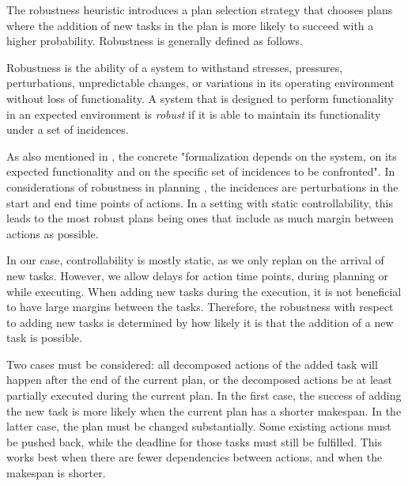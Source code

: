 The robustness heuristic introduces a plan selection strategy that chooses plans where the addition of new tasks in the plan is more likely to succeed with a higher probability.
Robustness is generally defined as follows.

\begin{definition}[Robustness]
    Robustness is the ability of a system to withstand stresses, pressures, perturbations, unpredictable changes, or variations in its operating environment without loss of functionality.
    A system that is designed to perform functionality in an expected environment is \emph{robust} if it is able to maintain its functionality under a set of incidences. \citep{barberRobustnessStabilityRecoverability2015}
\end{definition}

As also mentioned in \cite{barberRobustnessStabilityRecoverability2015}, the concrete "formalization depends on the system, on its expected functionality and on the specific set of incidences to be confronted".
In considerations of robustness in planning \citep{lundRobustExecutionProbabilistic2017}, the incidences are perturbations in the start and end time points of actions.
In a setting with static controllability, this leads to the most robust plans being ones that include as much margin between actions as possible.

In our case, controllability is mostly static, as we only replan on the arrival of new tasks.
However, we allow delays for action time points, during planning or while executing.
When adding new tasks during the execution, it is not beneficial to have large margins between the tasks.
Therefore, the robustness with respect to adding new tasks is determined by how likely it is that the addition of a new task is possible.

Two cases must be considered: all decomposed actions of the added task will happen after the end of the current plan, or the decomposed actions be at least partially executed during the current plan.
In the first case, the success of adding the new task is more likely when the current plan has a shorter makespan.
In the latter case, the plan must be changed substantially.
Some existing actions must be pushed back, while the deadline for those tasks must still be fulfilled.
This works best when there are fewer dependencies between actions, and when the makespan is shorter.


